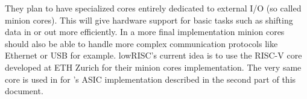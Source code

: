 They plan to have specialized cores entirely dedicated to external I/O (so called minion cores). This will give hardware support for basic tasks such as shifting data in or out more efficiently. In a more final implementation minion cores should also be able to handle more complex communication protocols like Ethernet or USB for example. lowRISC's current idea is to use the RISC-V core developed at ETH Zurich for their minion cores implementation. The very same core is used in for \pulpino's ASIC implementation described in the second part of this document.




